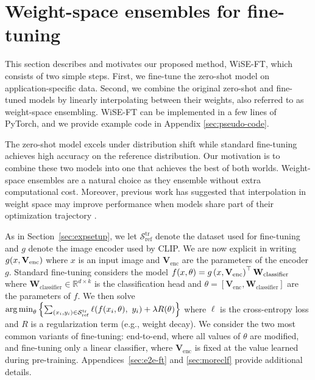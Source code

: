 \beforesec
\section{Weight-space ensembles for fine-tuning} 
\label{sec:main}
\postsec
This section describes and motivates our proposed method, WiSE-FT, which consists of two simple steps.
First, we fine-tune the zero-shot model on application-specific data. 
Second, we combine the original zero-shot and fine-tuned models by linearly interpolating between their weights, also referred to as weight-space ensembling.
WiSE-FT can be implemented in a few lines of PyTorch, and we provide example code in Appendix \ref{sec:pseudo-code}.

The zero-shot model excels under distribution shift while standard fine-tuning achieves high accuracy on the reference distribution.
Our motivation is to combine these two models into one that achieves the best of both worlds.
Weight-space ensembles are a natural choice as they ensemble without extra computational cost. 
Moreover,
previous work has suggested that interpolation in weight space
may improve performance when models share part of their optimization trajectory \cite{izmailov2018averaging, neyshabur2020being}.

As in Section~\ref{sec:expsetup}, we let $\mathcal{S}_{\mathrm{ref}}^\text{tr}$ denote the dataset used for fine-tuning and $g$ denote the image encoder used by CLIP.
We are now explicit in writing $g\mleft(x, \mathbf{V}_{\text{enc}} \mright)$ where $x$ is an input image and $\mathbf{V}_{\text{enc}}$ are the parameters of the encoder $g$.
Standard fine-tuning considers the model $f\mleft(x, \theta\mright) = g\left(x, \mathbf{V}_{\text{enc}}\right)^\top \textbf{W}_{\text{classifier}}$ where $\textbf{W}_{\text{classifier}} \in \mathbb{R}^{d \times k}$ is the classification head and $\theta = \left[\mathbf{V}_{\text{enc}}, \textbf{W}_{\text{classifier}} \right]$ are the parameters of $f$. 
We then solve $\argmin_{\theta} \left\{ \sum_{(x_i, y_i) \in \mathcal{S}^\text{tr}_\mathrm{ref}} \ell\mleft(f(x_i,\theta),\ y_i \mright) + \lambda R(\theta) \right\}$ where $\ell$ is the cross-entropy loss and $R$ is a regularization term (e.g., weight decay).
We consider the two most common variants of fine-tuning: end-to-end, where all values of $\theta$ are modified, and fine-tuning only a linear classifier, where $\mathbf{V}_{\text{enc}}$ is fixed at the value learned during pre-training. 
Appendices~\ref{sec:e2e-ft} and \ref{sec:moreclf} provide additional details. %

